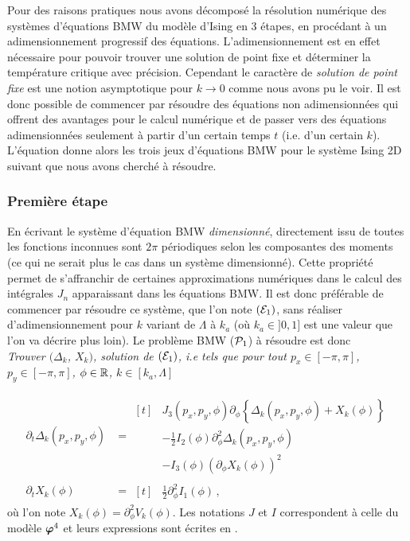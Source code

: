 \documentclass[10.5pt]{article}
\begin{document}
\begin{multicols}{2}
Pour des raisons pratiques nous avons décomposé la résolution numérique des systèmes d'équations BMW du modèle d'Ising en 3 étapes, en procédant à un adimensionnement progressif des équations. L'adimensionnement est en effet nécessaire pour pouvoir trouver une solution de point fixe et déterminer la température critique avec précision. Cependant le caractère de \textit{solution de point fixe} est une notion asymptotique pour $k \to 0$ comme nous avons pu le voir. Il est donc possible de commencer par résoudre des équations non adimensionnées qui offrent des avantages pour le calcul numérique et de passer vers des équations adimensionnées seulement à partir d'un certain temps $t$ (i.e. d'un certain $k$). \\

L'équation  donne alors les trois jeux d'équations BMW pour le système Ising 2D suivant que nous avons cherché à résoudre.



\subsubsection{Première étape}

En écrivant le système d'équation BMW \textit{dimensionné}, directement issu de  toutes les fonctions inconnues sont $2\pi$ périodiques selon les composantes des moments (ce qui ne serait plus le cas dans un système dimensionné). Cette propriété permet de s'affranchir de certaines approximations numériques dans le calcul des intégrales $J_n$ apparaissant dans les équations BMW. Il est donc préférable de commencer par résoudre ce système, que l'on note $(\mathcal{E}_1)$, sans réaliser d'adimensionnement pour $k$ variant de $\Lambda$ à $k_a$ (où $k_a \in ]0, 1]$ est une valeur que l'on va décrire plus loin). Le problème BMW ($\mathcal{P}_1$) à résoudre est donc \\

\noindent
{\itshape Trouver $(\Delta_k$, $X_k)$, solution de $(\mathcal{E}_1)$, i.e tels que pour tout $p_x \in [-\pi, \pi]$, $p_y \in [-\pi, \pi]$, $\phi \in \mathbb{R}$, $k\in [k_a, \Lambda]$}


\begin{align}
	\partial_t  \Delta_k (p_x, p_y, \phi) & = 
	\begin{aligned}[t]
	&  J_3(p_x, p_y, \phi) \partial_{\phi} \left\{ \Delta_k (p_x, p_y, \phi) + X_k(\phi) \right\} \\
	&  - \frac{1}{2} I_2(\phi) \partial_{\phi}^2 \Delta_k(p_x, p_y, \phi) \\
	& - I_3(\phi){(\partial_{\phi} X_k(\phi))}^2
	\end{aligned}
	\label{eqn} \\
	\partial_t X_k(\phi) & = 
	\begin{aligned}[t]
		& \frac{1}{2} \partial_{\phi}^2 I_1(\phi) \, ,
	\end{aligned}
\end{align}
où l'on note $X_k(\phi) = \partial_{\phi}^2 V_k(\phi)$. Les notations $J$ et $I$ correspondent à celle du modèle $\boldsymbol{ \varphi}^4$ et leurs expressions sont écrites en . \\



\end{multicols}
\end{document}

